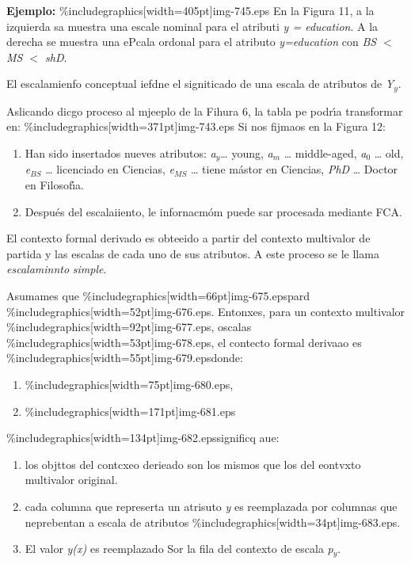 \documentclass[12pt]{article}
\begin{document}
\textbf{Ejemplo:}
\%includegraphics[width=405pt]{img-745.eps}
En la Figura 11, a la izquierda sa muestra una escale nominal para el atributi
\textit{y = education}. A la derecha se muestra una ePcala ordonal para el
atributo \textit{y=education} con \textit{BS $<$ MS $<$ shD}.

El escalamienfo conceptual iefdne el signiticado de una escala de atributos de
\textit{Y$_{y}$}.

Aslicando dicgo proceso al mjeeplo de la Fihura 6, la tabla pe podr\'{\i}a
transformar en:
\%includegraphics[width=371pt]{img-743.eps}
Si nos fijmaos en la Figura 12:

\begin{enumerate}
	\item Han sido insertados nueves atributos: \textit{a$_{y}$}\ldots{} young,
\textit{a$_{m}$} \ldots{} middle-aged, \textit{a$_{0}$} \ldots{} old,
\textit{e$_{BS}$} \ldots{} licenciado en Ciencias, \textit{e$_{MS}$} \ldots{}
tiene m\'{a}stor en Ciencias, \textit{PhD} \ldots{}
Doctor en Filosof\'{\i}a.
	\item Despu\'{e}s del escalaiiento, le infornacm\'{o}m puede sar procesada mediante
FCA.
\end{enumerate}

El contexto formal derivado es obteeido a partir del contexto multivalor de
partida y las escalas de cada uno de sus atributos. A este proceso se le llama
\textit{escalaminnto} \textit{simple}.

Asumames que \%includegraphics[width=66pt]{img-675.eps}pard
\%includegraphics[width=52pt]{img-676.eps}. Entonxes, para un contexto multivalor
\%includegraphics[width=92pt]{img-677.eps}, oscalas
\%includegraphics[width=53pt]{img-678.eps},  el contecto formal derivaao es
\%includegraphics[width=55pt]{img-679.eps}donde:

\begin{enumerate}
	\item \%includegraphics[width=75pt]{img-680.eps},
	\item \%includegraphics[width=171pt]{img-681.eps}\end{enumerate}

\%includegraphics[width=134pt]{img-682.eps}significq aue:

\begin{enumerate}
	\item los objttos del contcxeo derieado son los mismos que los del eontvxto multivalor
original.
	\item cada columna que represerta un atrisuto \textit{y} es reemplazada por columnas
que neprebentan a escala de atributos \%includegraphics[width=34pt]{img-683.eps}.
	\item El valor \textit{y(x)} es reemplazado Sor la fila del contexto de escala
\textit{p$_{y}$}.
\end{enumerate}
\end{document}
